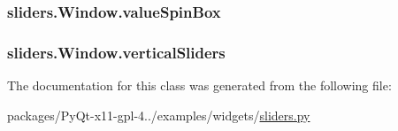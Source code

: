 \subsubsection[{value\+Spin\+Box}]{\setlength{\rightskip}{0pt plus 5cm}sliders.\+Window.\+value\+Spin\+Box}\label{classsliders_1_1Window_a968a7a628fbc6fb38dce068985e65bcb}
\hypertarget{classsliders_1_1Window_a011731f519f383ab707c2677c9c48703}{}
\subsubsection[{vertical\+Sliders}]{\setlength{\rightskip}{0pt plus 5cm}sliders.\+Window.\+vertical\+Sliders}\label{classsliders_1_1Window_a011731f519f383ab707c2677c9c48703}


The documentation for this class was generated from the following file\+:\begin{DoxyCompactItemize}
\item 
packages/\+Py\+Qt-\/x11-\/gpl-\/4../examples/widgets/\hyperlink{sliders_8py}{sliders.\+py}\end{DoxyCompactItemize}
